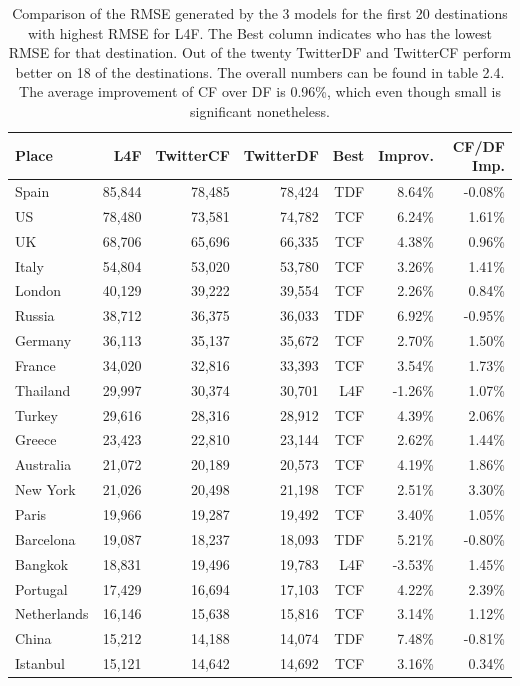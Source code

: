 \documentclass[minf,frontabs,twoside,singlespacing,parskip]{infthesis}
\begin{document}
\begin{table}[p]
\begin{center}
\begin{tabular}{ l | r | r | r | r | r | r }
Place & L4F &  TwitterCF & TwitterDF & Best & Improv. & CF/DF Imp. \\
\hline
Spain & 85,844 & 78,485 & 78,424 & TDF & 8.64\% & -0.08\%\\
US & 78,480 & 73,581 & 74,782 & TCF & 6.24\% & 1.61\%\\
UK & 68,706 & 65,696 & 66,335 & TCF & 4.38\% & 0.96\%\\
Italy & 54,804 & 53,020 & 53,780 & TCF & 3.26\% & 1.41\%\\
London & 40,129 & 39,222 & 39,554 & TCF & 2.26\% & 0.84\%\\
Russia & 38,712 & 36,375 & 36,033 & TDF & 6.92\% & -0.95\%\\
Germany & 36,113 & 35,137 & 35,672 & TCF & 2.70\% & 1.50\%\\
France & 34,020 & 32,816 & 33,393 & TCF & 3.54\% & 1.73\%\\
Thailand & 29,997 & 30,374 & 30,701 & L4F & -1.26\% & 1.07\%\\
Turkey & 29,616 & 28,316 & 28,912 & TCF & 4.39\% & 2.06\%\\
Greece & 23,423 & 22,810 & 23,144 & TCF & 2.62\% & 1.44\%\\
Australia & 21,072 & 20,189 & 20,573 & TCF & 4.19\% & 1.86\%\\
New York & 21,026 & 20,498 & 21,198 & TCF & 2.51\% & 3.30\%\\
Paris & 19,966 & 19,287 & 19,492 & TCF & 3.40\% & 1.05\%\\
Barcelona & 19,087 & 18,237 & 18,093 & TDF & 5.21\% & -0.80\%\\
Bangkok & 18,831 & 19,496 & 19,783 & L4F & -3.53\% & 1.45\%\\
Portugal & 17,429 & 16,694 & 17,103 & TCF & 4.22\% & 2.39\%\\
Netherlands & 16,146 & 15,638 & 15,816 & TCF & 3.14\% & 1.12\%\\
China & 15,212 & 14,188 & 14,074 & TDF & 7.48\% & -0.81\%\\
Istanbul & 15,121 & 14,642 & 14,692 & TCF & 3.16\% & 0.34\%
\end{tabular}
\end{center}
\caption{Comparison of the RMSE generated by the 3 models for the first 20 destinations with highest RMSE for L4F. The Best column indicates who has the lowest RMSE for that destination. Out of the twenty TwitterDF and TwitterCF perform better on 18 of the destinations. The overall numbers can be found in table 2.4. The average improvement of CF over DF is 0.96\%, which even though small is significant nonetheless. }
\label{big-table}
\end{table}
\end{document}
